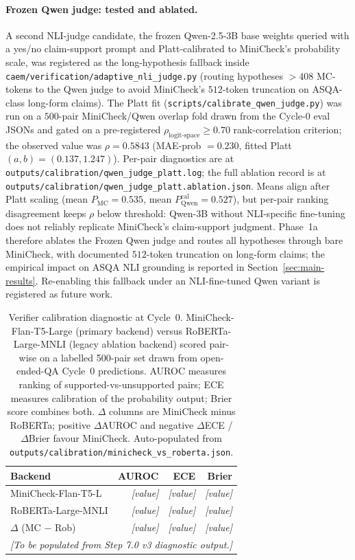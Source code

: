 \paragraph{Frozen Qwen judge: tested and ablated.} A second NLI-judge candidate, the frozen Qwen-2.5-3B base weights queried with a yes/no claim-support prompt and Platt-calibrated to MiniCheck's probability scale, was registered as the long-hypothesis fallback inside \texttt{caem/verification/adaptive\_nli\_judge.py} (routing hypotheses $> 408$ MC-tokens to the Qwen judge to avoid MiniCheck's $512$-token truncation on ASQA-class long-form claims). The Platt fit (\texttt{scripts/calibrate\_qwen\_judge.py}) was run on a $500$-pair MiniCheck/Qwen overlap fold drawn from the Cycle-$0$ eval JSONs and gated on a pre-registered $\rho_{\text{logit-space}} \geq 0.70$ rank-correlation criterion; the observed value was $\rho = 0.5843$ (MAE-prob $= 0.230$, fitted Platt $(a, b) = (0.137, 1.247)$). Per-pair diagnostics are at \texttt{outputs/calibration/qwen\_judge\_platt.log}; the full ablation record is at \texttt{outputs/calibration/qwen\_judge\_platt.ablation.json}. Means align after Platt scaling (mean $P_{\text{MC}} = 0.535$, mean $P_{\text{Qwen}}^{\text{cal}} = 0.527$), but per-pair ranking disagreement keeps $\rho$ below threshold: Qwen-3B without NLI-specific fine-tuning does not reliably replicate MiniCheck's claim-support judgment. Phase~1a therefore ablates the Frozen Qwen judge and routes all hypotheses through bare MiniCheck, with documented $512$-token truncation on long-form claims; the empirical impact on ASQA NLI grounding is reported in Section~\ref{sec:main-results}. Re-enabling this fallback under an NLI-fine-tuned Qwen variant is registered as future work.

\begin{table}[t]
\centering
\caption{Verifier calibration diagnostic at Cycle~0. MiniCheck-Flan-T5-Large
(primary backend) versus RoBERTa-Large-MNLI (legacy ablation backend)
scored pair-wise on a labelled 500-pair set drawn from open-ended-QA
Cycle~0 predictions. AUROC measures ranking of supported-vs-unsupported
pairs; ECE measures calibration of the probability output; Brier score
combines both. $\Delta$ columns are MiniCheck minus RoBERTa; positive
$\Delta$AUROC and negative $\Delta$ECE / $\Delta$Brier favour MiniCheck.
Auto-populated from \texttt{outputs/calibration/minicheck\_vs\_roberta.json}.}
\label{tab:verifier-calibration}
\begin{tabular}{lrrr}
\toprule
Backend & AUROC & ECE & Brier \\
\midrule
MiniCheck-Flan-T5-L & \emph{[value]} & \emph{[value]} & \emph{[value]} \\
RoBERTa-Large-MNLI  & \emph{[value]} & \emph{[value]} & \emph{[value]} \\
$\Delta$ (MC $-$ Rob) & \emph{[value]} & \emph{[value]} & \emph{[value]} \\
\midrule
\multicolumn{4}{c}{\emph{[To be populated from Step 7.0 v3 diagnostic output.]}}\\
\bottomrule
\end{tabular}
\end{table}

